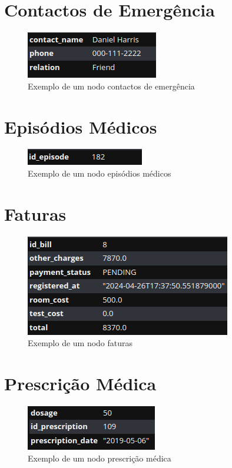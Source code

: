 \section{Contactos de Emergência}\label{secContactosEmergencia}
\begin{figure}[H]
    \centering
    \includegraphics[width=0.3\linewidth]{Imagens/Neo4j/emergency_contact.png}
    \caption{Exemplo de um nodo contactos de emergência}
    \label{fig:nodo_contactos_emergencia}
\end{figure}

\section{Episódios Médicos}\label{secEpisodiosMedicos}
\begin{figure}[H]
    \centering
    \includegraphics[width=0.3\linewidth]{Imagens/Neo4j/episode.png}
    \caption{Exemplo de um nodo episódios médicos}
    \label{fig:nodo_episodios_medicos}
\end{figure}

\section{Faturas}\label{secFaturas}
\begin{figure}[H]
    \centering
    \includegraphics[width=0.3\linewidth]{Imagens/Neo4j/bill.png}
    \caption{Exemplo de um nodo faturas}
    \label{fig:nodo_faturas}
\end{figure}

\section{Prescrição Médica}\label{secPrescricaoMedica}
\begin{figure}[H]
    \centering
    \includegraphics[width=0.3\linewidth]{Imagens/Neo4j/prescription.png}
    \caption{Exemplo de um nodo prescrição médica}
    \label{fig:nodo_prescricao_medica}
\end{figure}

